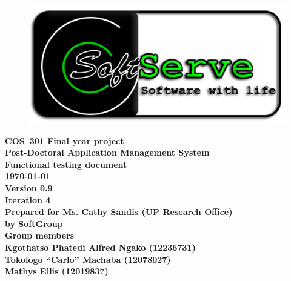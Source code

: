 \documentclass[12pt]{article}
\newcommand{\Title}{Functional testing document} %
\newcommand{\Class}{COS\ 301 Final year project} %
\newcommand{\ssr}{Soft\color{green}{Serve }\color{black}}
\newcommand{\version}{0.9}
\newcommand{\iteration}{4}
\newcommand{\client}{Ms. Cathy Sandis (UP Research Office)}
\newcommand{\project}{Post-Doctoral Application Management System}
\begin{document}
\vspace{4em}

\begin{center}%

\begin{figure}[ht!]
\centering
\includegraphics{../Images_Docs/logo.png}
\end{figure}
\LARGE \bf \Class \\[0.25em]
\LARGE \bf \project \\[1em]
\LARGE \bf \Title \\[0.25em]
\large \bf \today\\
\bf Version \version\\
\bf Iteration \iteration\\[0.5em]
\Large \bf Prepared for \client\\
\Large \bf by
\Large {\bf \ssr Group }\\[0.5em]
\LARGE {\bf Group members}\\[0.25em]
\large
Kgothatso Phatedi Alfred Ngako (12236731) \\[0.5em]
Tokologo “Carlo” Machaba (12078027) \\[0.5em]
Mathys Ellis (12019837) \\[8em]

\end{center}%

\end{document}
